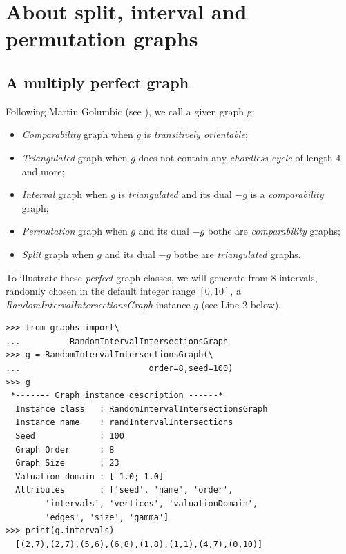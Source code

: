 \chapter{About split, interval and permutation graphs}
\label{sec:25}

\abstract*{}

\abstract{}

\tableofcontents


\section{A multiply perfect graph}
\label{sec:25.1}

Following Martin Golumbic (see \citet[p. 149]{GOL-2004}), we call a given graph g:
\begin{itemize}
\item \emph{Comparability} graph when $g$  is \emph{transitively orientable};
\item \emph{Triangulated} graph when $g$ does not contain any \emph{chordless cycle} of length 4 and more;
\item \emph{Interval} graph when $g$ is \emph{triangulated} and its dual $-g$ is a \emph{comparability} graph;
\item \emph{Permutation} graph when $g$ and its dual $-g$ bothe are \emph{comparability} graphs;
\item \emph{Split} graph when $g$ and its dual $-g$ bothe are \emph{triangulated} graphs.
\end{itemize}

To illustrate these \emph{perfect} graph classes, we will generate from 8 intervals, randomly chosen in the default integer range $[0,10]$, a \emph{RandomIntervalIntersectionsGraph} instance $g$ (see Line 2 below). 
\begin{lstlisting}
>>> from graphs import\
...          RandomIntervalIntersectionsGraph
>>> g = RandomIntervalIntersectionsGraph(\
...                          order=8,seed=100)
>>> g
 *------- Graph instance description ------*
  Instance class   : RandomIntervalIntersectionsGraph
  Instance name    : randIntervalIntersections
  Seed             : 100
  Graph Order      : 8
  Graph Size       : 23
  Valuation domain : [-1.0; 1.0]
  Attributes       : ['seed', 'name', 'order',
        'intervals', 'vertices', 'valuationDomain',
        'edges', 'size', 'gamma']
>>> print(g.intervals)
  [(2,7),(2,7),(5,6),(6,8),(1,8),(1,1),(4,7),(0,10)]
\end{lstlisting}

